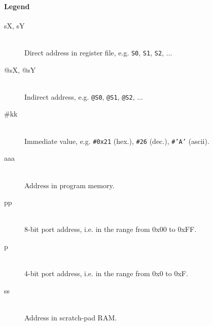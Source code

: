 \newcommand{\instruction}[1]{~\\[7pt]\addcontentsline{toc}{subsection}{#1}\colorbox{instruction_bg}{\parbox{\dimexpr\textwidth-2\fboxsep}{\color{black}\textbf{#1}}}\bigskip}

\newcommand{\pbflags}[2]{
    ~\\\indent
    \begin{tabular}{ll}
        \fbox{\texttt{Z}} & #1 \\
        \fbox{\texttt{C}} & #2
    \end{tabular}
}

\newcommand{\pbavailability}[5]{
    ~\\\indent
    \begin{tabular}{ccccc}
        PicoBlaze 6 & PicoBlaze 3 & PicoBlaze II & PicoBlaze & PicoBlaze CPLD \\
        #1          & #2         & #3            & #4        & #5
    \end{tabular}
}

\paragraph{Legend}
    \begin{description}
        \item[sX, sY]~\\
            Direct address in register file, e.g. \texttt{S0}, \texttt{S1}, \texttt{S2}, ...
        \item[@sX, @sY]~\\
            Indirect address, e.g. \texttt{@S0}, \texttt{@S1}, \texttt{@S2}, ...
        \item[\#kk]~\\
            Immediate value, e.g. \texttt{\#0x21} (hex.), \texttt{\#26} (dec.), \texttt{\#'A'} (ascii).
        \item[aaa]~\\
            Address in program memory.
        \item[pp]~\\
            8-bit port address, i.e. in the range from 0x00 to 0xFF.
        \item[p]~\\
            4-bit port address, i.e. in the range from 0x0 to 0xF.
        \item[ss]~\\
            Address in scratch-pad RAM.
    \end{description}

